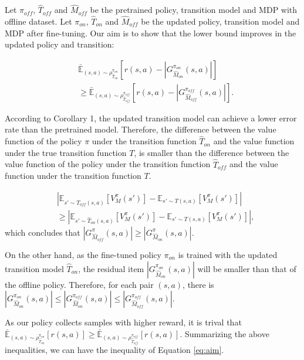 \documentclass[letterpaper]{article} %
\begin{document}
Let $\pi_{off}$, $\hat{T}_{off}$ and $\hat{M}_{off}$ be the pretrained policy, transition model and MDP with offline dataset. Let $\pi_{on}$, $\hat{T}_{on}$ and $\hat{M}_{off}$ be the updated policy, transition model and MDP after fine-tuning. Our aim is to show that the lower bound improves in the updated policy and transition:

\begin{equation}
\begin{aligned}
  \label{eq:aim}
  &\bar{\mathbb{E}}_{(s,a)\sim \rho^{\pi_{on}}_{\hat{T}_{on}}} [ r(s,a)- |G^{\pi_{on}}_{\hat{M}_{on}} (s, a) |] \\ &\geq \bar{\mathbb{E}}_{(s,a)\sim \rho^{\pi_{off}}_{\hat{T}_{off}}} [ r(s,a)- |G^{\pi_{off}}_{\hat{M}_{off}} (s, a) |].
\end{aligned}
\end{equation}

According to Corollary 1, the updated transition model can achieve a lower error rate than the pretrained model. Therefore, the difference between the value function of the policy $\pi$ under the transition function $\hat{T}_{on}$ and the value function under the true transition function $T$, is smaller than the difference between the value function of the policy under the transition function $\hat{T}_{off}$ and the value function under the transition function $T$.

\begin{equation}
  \begin{aligned}
    &|\mathbb{E}_{s'\sim\hat{T}_{off}(s,a)}  [V^{\pi}_{M} (s')] - \mathbb{E}_{s'\sim T (s,a)} [V^{\pi}_{M} (s')]| \\
    &\geq |\mathbb{E}_{s'\sim\hat{T}_{on}(s,a)}  [V^{\pi}_{M} (s')] - \mathbb{E}_{s'\sim T (s,a)} [V^{\pi}_{M} (s')]|,
  \end{aligned}
  \end{equation}
which concludes that $|G^{\pi}_{\hat{M}_{off}} (s, a) |\geq |G^{\pi}_{\hat{M}_{on}} (s, a) |$.

On the other hand, as the fine-tuned policy $\pi_{on}$ is trained with the updated transition model $\hat{T}_{on}$, the residual item $|G^{\pi_{on}}_{\hat{M}_{on}} (s, a) |$ will be smaller than that of the offline policy. Therefore, for each pair $(s,a)$, there is $|G^{\pi_{on}}_{\hat{M}_{on}} (s, a) |\leq |G^{\pi_{off}}_{\hat{M}_{on}} (s, a) | \leq |G^{\pi_{off}}_{\hat{M}_{off}} (s, a) |$.

As our policy collects samples with higher reward, it is trival that $\bar{\mathbb{E}}_{(s,a)\sim \rho^{\pi_{on}}_{\hat{T}_{on}}} [ r(s,a)] \geq \bar{\mathbb{E}}_{(s,a)\sim \rho^{\pi_{off}}_{\hat{T}_{off}}} [ r(s,a)]$. Summarizing the above inequalities, we can have the inequality of Equation \ref{eq:aim}.
\end{document}
